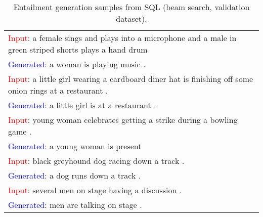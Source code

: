\begin{table*}
\begin{tabular}{p{}}
\midrule
\textcolor{red}{Input}: a female sings and plays into a microphone and a male in green striped shorts plays a hand drum \\
\textcolor{blue}{Generated}: a woman is playing music . \\
\midrule
\textcolor{red}{Input}: a little girl wearing a cardboard diner hat is finishing off some onion rings at a restaurant . \\
\textcolor{blue}{Generated}: a little girl is at a restaurant . \\
\midrule
\textcolor{red}{Input}: young woman celebrates getting a strike during a bowling game . \\
\textcolor{blue}{Generated}: a young woman is present \\
\midrule
\textcolor{red}{Input}: black greyhound dog racing down a track . \\
\textcolor{blue}{Generated}: a dog runs down a track . \\
\midrule
\textcolor{red}{Input}: several men on stage having a discussion . \\
\textcolor{blue}{Generated}: men are talking on stage . \\
\bottomrule
\end{tabular}
\vspace{5pt}
\caption{Entailment generation samples from SQL (beam search, validation dataset).}
\label{table:entailment-generation-examples-sql}
\end{table*}

